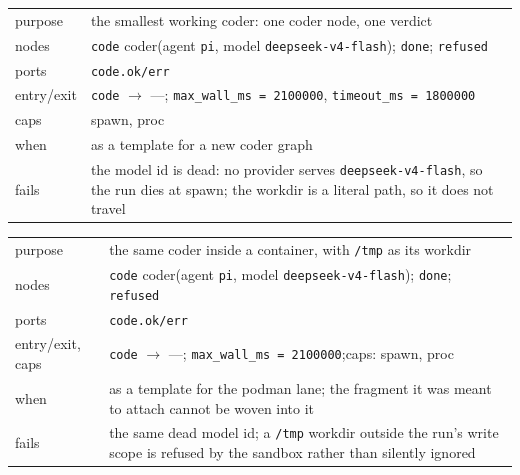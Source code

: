 \begin{center}\footnotesize
\begin{tabular}{@{}>{\raggedright\arraybackslash}p{}>{\raggedright\arraybackslash}p{}@{}}
  purpose & the smallest working coder: one coder node, one verdict \\
  nodes & \texttt{code} coder(agent \texttt{pi}, model \texttt{deepseek-v4-flash});
    \texttt{done}; \texttt{refused} \\
  ports & \texttt{code.ok/err} \\
  entry/exit & \texttt{code} $\to$ ---; \texttt{max\_wall\_ms = 2100000},
    \texttt{timeout\_ms = 1800000} \\
  caps & spawn, proc \\
  when & as a template for a new coder graph \\
  fails & the model id is dead: no provider serves \texttt{deepseek-v4-flash}, so the run
    dies at spawn; the workdir is a literal path, so it does not travel \\
\end{tabular}
\end{center}

\begin{center}\footnotesize
\begin{tabular}{@{}>{\raggedright\arraybackslash}p{}>{\raggedright\arraybackslash}p{}@{}}
  purpose & the same coder inside a container, with \texttt{/tmp} as its workdir \\
  nodes & \texttt{code} coder(agent \texttt{pi}, model \texttt{deepseek-v4-flash});
    \texttt{done}; \texttt{refused} \\
  ports & \texttt{code.ok/err} \\
  entry/exit, caps & \texttt{code} $\to$ ---; \texttt{max\_wall\_ms = 2100000};\newline caps: spawn, proc \\
  when & as a template for the podman lane; the fragment it was meant to attach cannot be
    woven into it \\
  fails & the same dead model id; a \texttt{/tmp} workdir outside the run's write scope is
    refused by the sandbox rather than silently ignored \\
\end{tabular}
\end{center}

